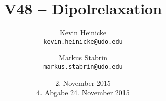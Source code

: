 



\title{%
    V48 -- Dipolrelaxation
}
\author{%
    Kevin Heinicke\\
    \texttt{kevin.heinicke@udo.edu}
    \and
    Markus Stabrin\\
    \texttt{markus.stabrin@udo.edu}
}
\date{%
    2. November 2015\\
    {\small 4. Abgabe} 24. November 2015\\
}

    \maketitle%
    \tableofcontents
    \newpage
    
    

    \printbibliography

